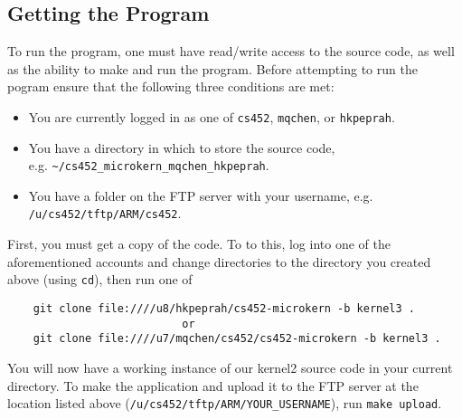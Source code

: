 \documentclass[12pt]{article}
\begin{document}
\subsection{Getting the Program}
To run the program, one must have read/write access to the source code, as well as the ability to make and run the program.  Before attempting to run the pogram ensure that the following three conditions are met:
\begin{itemize}
  \item You are currently logged in as one of \texttt{cs452}, \texttt{mqchen}, or \texttt{hkpeprah}.
  \item You have a directory in which to store the source code, \\ e.g. \texttt{\textasciitilde/cs452\_microkern\_mqchen\_hkpeprah}.
  \item You have a folder on the FTP server with your username, e.g. \texttt{/u/cs452/tftp/ARM/cs452}.
\end{itemize}
First, you must get a copy of the code.  To to this, log into one of the aforementioned accounts and change directories to the directory you created above (using \texttt{cd}), then run one of
\begin{center}
  \begin{verbatim}
    git clone file:////u8/hkpeprah/cs452-microkern -b kernel3 .
                           or
    git clone file:////u7/mqchen/cs452/cs452-microkern -b kernel3 .
  \end{verbatim}
\end{center}
\vspace{-0.5cm}You will now have a working instance of our kernel2 source code in your current directory.  To make the application and upload it to the FTP server at the location listed above (\texttt{/u/cs452/tftp/ARM/YOUR\_USERNAME}), run \texttt{make upload}.
\\[1\baselineskip]
\end{document}
